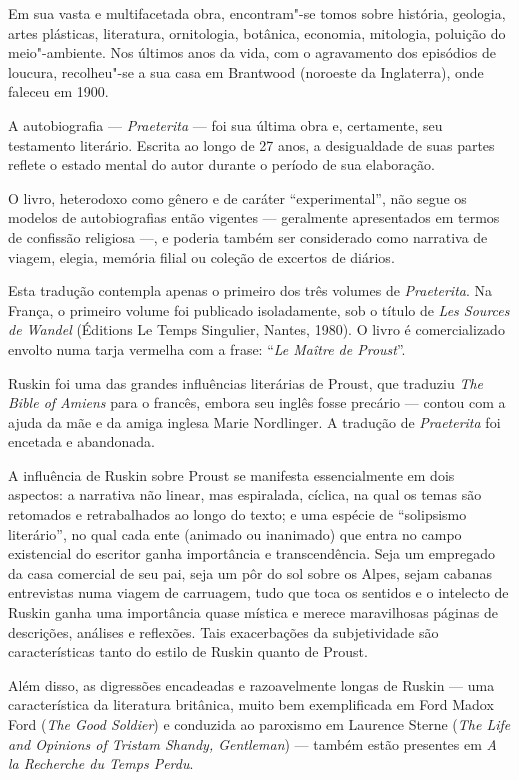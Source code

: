 Em sua vasta e multifacetada obra, encontram"-se tomos sobre história,
geologia, artes plásticas, literatura, ornitologia, botânica, economia,
mitologia, poluição do meio"-ambiente. Nos últimos anos da vida, com o
agravamento dos episódios de loucura, recolheu"-se a sua casa em
Brantwood (noroeste da Inglaterra), onde faleceu em 1900.

A autobiografia --- \emph{Praeterita} --- foi sua última obra e,
certamente, seu testamento literário. Escrita ao longo de 27 anos, a
desigualdade de suas partes reflete o estado mental do autor durante o
período de sua elaboração.

O livro, heterodoxo como gênero e de caráter ``experimental'', não segue
os modelos de autobiografias então vigentes --- geralmente apresentados
em termos de confissão religiosa ---, e poderia também ser considerado
como narrativa de viagem, elegia, memória filial ou coleção de excertos
de diários.

Esta tradução contempla apenas o primeiro dos três volumes de
\emph{Praeterita}. Na França, o primeiro volume foi publicado
isoladamente, sob o título de \emph{Les Sources de Wandel} (Éditions Le
Temps Singulier, Nantes, 1980). O livro é comercializado envolto numa
tarja vermelha com a frase: ``\emph{Le Maître de Proust}''.

Ruskin foi uma das grandes influências literárias de Proust, que
traduziu \emph{The Bible of Amiens} para o francês, embora seu inglês
fosse precário --- contou com a ajuda da mãe e da amiga inglesa Marie
Nordlinger. A tradução de \emph{Praeterita} foi encetada e abandonada.

A influência de Ruskin sobre Proust se manifesta essencialmente em dois
aspectos: a narrativa não linear, mas espiralada, cíclica, na qual os
temas são retomados e retrabalhados ao longo do texto; e uma espécie de
``solipsismo literário'', no qual cada ente (animado ou inanimado) que
entra no campo existencial do escritor ganha importância e
transcendência. Seja um empregado da casa comercial de seu pai, seja um
pôr do sol sobre os Alpes, sejam cabanas entrevistas numa viagem de
carruagem, tudo que toca os sentidos e o intelecto de Ruskin ganha uma
importância quase mística e merece maravilhosas páginas de descrições,
análises e reflexões. Tais exacerbações da subjetividade são
características tanto do estilo de Ruskin quanto de Proust.

Além disso, as digressões encadeadas e razoavelmente longas de Ruskin ---
uma característica da literatura britânica, muito bem exemplificada em
Ford Madox Ford (\emph{The Good Soldier}) e conduzida ao paroxismo em
Laurence Sterne (\emph{The Life and Opinions of Tristam Shandy,
Gentleman}) --- também estão presentes em \emph{A la Recherche du Temps
Perdu}.


